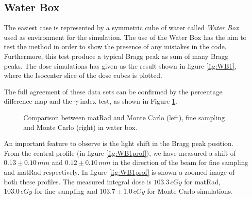 \documentclass[12pt, a4paper, twoside]{book}
\begin{document}

\subsection{Water Box}
The easiest case is represented by a symmetric cube of water called \emph{Water Box} used as environment for the simulation. The use of the Water Box has the aim to test the method in order to show the presence of any mistakes in the code. Furthermore, this test produce a typical Bragg peak as sum of many Bragg peaks. 
The dose simulations has given us the result shown in figure \ref{fig:WB1}, where the Isocenter slice of the dose cubes is plotted.



The full agreement of these data sets can be confirmed by the percentage difference map and the $\gamma$-index test, as shown in Figure \ref{fig:WB1gam}.
\begin{figure}[!ht]
\centering
{} 
\caption{Comparison between matRad and Monte Carlo (left), fine sampling and Monte Carlo (right) in water box.}
\label{fig:WB1gam}
\end{figure}

An important feature to observe is the light shift in the Bragg peak position. From the central profile (in figure \ref{fig:WB1prof}), we have measured a shift of $0.13\pm0.10\,mm$ and $0.12\pm0.10\,mm$ in the direction of the beam for fine sampling and matRad respectively. In figure \ref{fig:WB1prof} is shown a zoomed image of both these profiles.
The measured integral dose is $103.3\,cGy$ for matRad, $103.0\,cGy$ for fine sampling and $103.7\pm1.0\,cGy$ for Monte Carlo simulations.\\
\\
\end{document}
